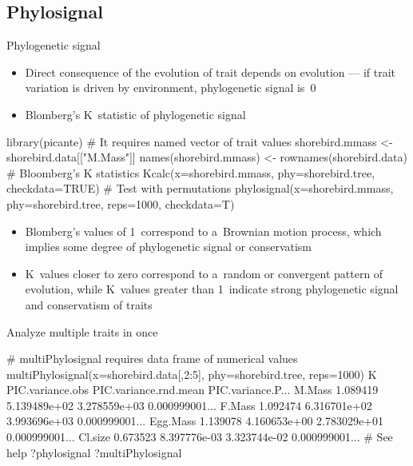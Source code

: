 \documentclass[compress, xelatex, 11pt, xcolor=svgnames, aspectratio=169,
	hyperref={
		bookmarks=true,
		unicode=true,
		colorlinks=true,
		pdftitle={Molecular data in R},
		plainpages=false,
		pdfauthor={Vojtech Zeisek},
		pdfsubject={Course about phylogeny and evolution in R},
		pdfcreator={XeLaTeX},
		pdfkeywords={R, evolution, phylogeny, molecular data},
		linkcolor=Crimson, %
		anchorcolor=Magenta, %
		citecolor=Magenta, %
		filecolor=Magenta, %
		menucolor=Magenta, %
		urlcolor=DodgerBlue, %
		},
	url={hyphens, lowtilde} %
	]{beamer}
\begin{document}
\subsection{Phylosignal}

\begin{frame}[fragile]{Phylogenetic signal}
	\begin{itemize}
		\item Direct consequence of the evolution of trait depends on evolution --- if trait variation is driven by environment, phylogenetic signal is~0
		\item Blomberg's K~statistic of phylogenetic signal
	\end{itemize}
	\begin{spluscode}
    library(picante)
    # It requires named vector of trait values
    shorebird.mmass <- shorebird.data[["M.Mass"]]
    names(shorebird.mmass) <- rownames(shorebird.data)
    # Bloomberg's K statistics
    Kcalc(x=shorebird.mmass, phy=shorebird.tree, checkdata=TRUE)
    # Test with permutations
    phylosignal(x=shorebird.mmass, phy=shorebird.tree, reps=1000, checkdata=T)
\end{spluscode}
	\begin{itemize}
		\item Blomberg's values of 1~correspond to a~Brownian motion process, which implies some degree of phylogenetic signal or conservatism
		\item K~values closer to zero correspond to a~random or convergent pattern of evolution, while K~values greater than 1~indicate strong phylogenetic signal and conservatism of traits
	\end{itemize}
\end{frame}

\begin{frame}[fragile]{Analyze multiple traits in once}
	\begin{spluscode}
    # multiPhylosignal requires data frame of numerical values
    multiPhylosignal(x=shorebird.data[,2:5], phy=shorebird.tree, reps=1000)
                    K PIC.variance.obs PIC.variance.rnd.mean PIC.variance.P...
    M.Mass   1.089419     5.139489e+02          3.278559e+03    0.000999001...
    F.Mass   1.092474     6.316701e+02          3.993696e+03    0.000999001...
    Egg.Mass 1.139078     4.160653e+00          2.783029e+01    0.000999001...
    Cl.size  0.673523     8.397776e-03          3.323744e-02    0.000999001...
    # See help
    ?phylosignal
    ?multiPhylosignal
	\end{spluscode}
\end{frame}
\end{document}
